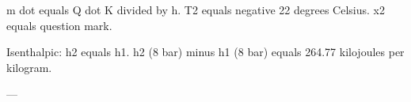 m dot equals Q dot K divided by h.  
T2 equals negative 22 degrees Celsius.  
x2 equals question mark.  

Isenthalpic: h2 equals h1.  
h2 (8 bar) minus h1 (8 bar) equals 264.77 kilojoules per kilogram.  

---